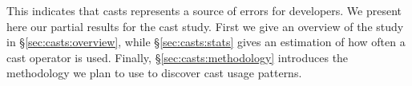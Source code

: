 This indicates that casts represents a source of errors for developers.
We present here our partial results for the cast study.
First we give an overview of the study in \S\ref{sec:casts:overview}, while \S\ref{sec:casts:stats} gives an estimation of how often a cast operator is used.
Finally, \S\ref{sec:casts:methodology} introduces the methodology we plan to use to discover cast usage patterns.
